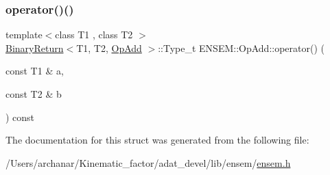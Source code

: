 \mbox{\label{structENSEM_1_1OpAdd_a5929c83274ec805686f85b4e65bd70c6}} 
\subsubsection{\texorpdfstring{operator()()}{operator()()}\hspace{0.1cm}{\footnotesize\ttfamily [2/2]}}
{\footnotesize\ttfamily template$<$class T1 , class T2 $>$ \\
\mbox{\hyperlink{structENSEM_1_1BinaryReturn}{Binary\+Return}}$<$T1, T2, \mbox{\hyperlink{structENSEM_1_1OpAdd}{Op\+Add}} $>$\+::Type\+\_\+t E\+N\+S\+E\+M\+::\+Op\+Add\+::operator() (\begin{DoxyParamCaption}\item[{const T1 \&}]{a,  }\item[{const T2 \&}]{b }\end{DoxyParamCaption}) const\hspace{0.3cm}{\ttfamily [inline]}}



The documentation for this struct was generated from the following file\+:\begin{DoxyCompactItemize}
\item 
/\+Users/archanar/\+Kinematic\+\_\+factor/adat\+\_\+devel/lib/ensem/\mbox{\hyperlink{lib_2ensem_2ensem_8h}{ensem.\+h}}\end{DoxyCompactItemize}

